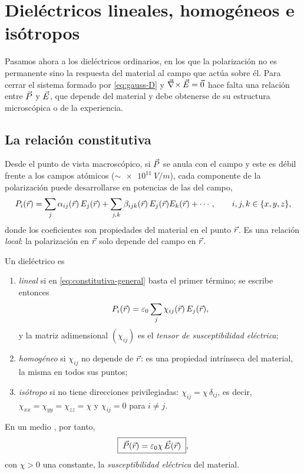 \section{Dieléctricos lineales, homogéneos e isótropos}\label{sec:lineales}

Pasamos ahora a los dieléctricos ordinarios, en los que la polarización no es permanente sino la respuesta
del material al campo que actúa sobre él. Para cerrar el sistema formado por \eqref{eq:gauss-D} y
$\vec\nabla\!\times\vec E=\vec 0$ hace falta una relación entre $\vec P$ y $\vec E$, que depende del material y debe obtenerse de su
estructura microscópica o de la experiencia.

\subsection{La relación constitutiva}\label{sec:constitutiva}

Desde el punto de vista macroscópico, si $\vec P$ se anula con el campo y este es débil frente a los campos
atómicos ($\sim\SI{e11}{V/m}$), cada componente de la polarización puede desarrollarse en potencias de las del campo,
\begin{equation}\label{eq:constitutiva-general}
  P_i(\vec r)=\sum_{j}\alpha_{ij}(\vec r)\,E_j(\vec r)+\sum_{j,k}\beta_{ijk}(\vec r)\,E_j(\vec r)E_k(\vec r)+\cdots,
  \qquad i,j,k\in\{x,y,z\},
\end{equation}
donde los coeficientes son propiedades del material en el punto $\vec r$. Es una relación \emph{local}: la
polarización en $\vec r$ solo depende del campo en $\vec r$.

\begin{definicion}\label{def:LHI}
Un dieléctrico es
\begin{enumerate}
  \item \emph{lineal} si en \eqref{eq:constitutiva-general} basta el primer término; se escribe entonces
        \begin{equation}\label{eq:chi-tensor}
          P_i(\vec r)=\varepsilon_0\sum_j\chi_{ij}(\vec r)\,E_j(\vec r),
        \end{equation}
        y la matriz adimensional $(\chi_{ij})$ es el \emph{tensor de susceptibilidad eléctrica};
  \item \emph{homogéneo} si $\chi_{ij}$ no depende de $\vec r$: es una propiedad intrínseca del material, la misma en
        todos sus puntos;
  \item \emph{isótropo} si no tiene direcciones privilegiadas: $\chi_{ij}=\chi\,\delta_{ij}$, es decir,
        $\chi_{xx}=\chi_{yy}=\chi_{zz}=\chi$ y $\chi_{ij}=0$ para $i\neq j$.
\end{enumerate}
En un medio \LHI{}, por tanto,
\begin{equation}\label{eq:chi}
  \boxed{\;\vec P(\vec r)=\varepsilon_0\chi\,\vec E(\vec r)\;},
\end{equation}
con $\chi>0$ una constante, la \emph{susceptibilidad eléctrica} del material.
\end{definicion}

